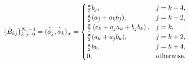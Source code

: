 
\begin{equation}
 \{\tilde{B}_{kj}\}_{k,j=0}^{N_x-4} = (\tilde{\phi}_j, \tilde{\phi}_k)_w = \begin{cases}
  \frac{\pi}{2} b_j, &j=k-4,\\
  \frac{\pi}{2} (a_j+ a_k b_j), &j=k-2,\\
 \frac{\pi}{2}\left({c_k} + a_j a_k +b_jb_k \right), &j=k,\\
 \frac{\pi}{2} (a_k+ a_j b_k) , & j=k+2, \\
   \frac{\pi}{2} b_k, &j=k+4,\\
 0, &\text{otherwise}.
 \end{cases}
\end{equation}

